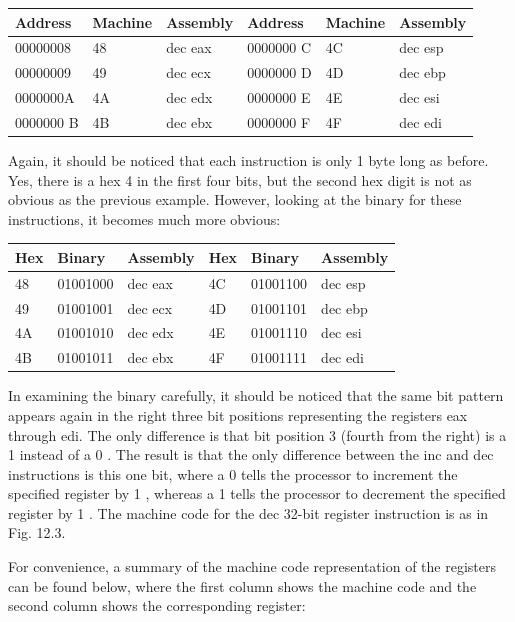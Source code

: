 \documentclass[10pt]{book}
\begin{document}
\begin{center}
\begin{tabular}{|l|l|l|l|l|l|}
\hline
Address & Machine & Assembly & Address & Machine & Assembly \\
\hline
00000008 & 48 & dec eax & 0000000 C & 4C & dec esp \\
\hline
00000009 & 49 & dec ecx & 0000000 D & 4D & dec ebp \\
\hline
0000000A & 4A & dec edx & 0000000 E & 4E & dec esi \\
\hline
0000000 B & 4B & dec ebx & 0000000 F & 4F & dec edi \\
\hline
\end{tabular}
\end{center}

Again, it should be noticed that each instruction is only 1 byte long as before. Yes, there is a hex 4 in the first four bits, but the second hex digit is not as obvious as the previous example. However, looking at the binary for these instructions, it becomes much more obvious:

\begin{center}
\begin{tabular}{|l|l|l|l|l|l|}
\hline
Hex & Binary & Assembly & Hex & Binary & Assembly \\
\hline
48 & 01001000 & dec eax & 4C & 01001100 & dec esp \\
\hline
49 & 01001001 & dec ecx & 4D & 01001101 & dec ebp \\
\hline
4A & 01001010 & dec edx & 4E & 01001110 & dec esi \\
\hline
4B & 01001011 & dec ebx & 4F & 01001111 & dec edi \\
\hline
\end{tabular}
\end{center}

In examining the binary carefully, it should be noticed that the same bit pattern appears again in the right three bit positions representing the registers eax through edi. The only difference is that bit position 3 (fourth from the right) is a 1 instead of a 0 . The result is that the only difference between the inc and dec instructions is this one bit, where a 0 tells the processor to increment the specified register by 1 , whereas a 1 tells the processor to decrement the specified register by 1 . The machine code for the dec 32-bit register instruction is as in Fig. 12.3.

For convenience, a summary of the machine code representation of the registers can be found below, where the first column shows the machine code and the second column shows the corresponding register:
\end{document}
